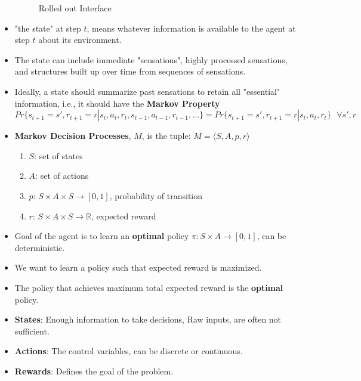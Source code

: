 \documentclass[a4paper]{article}
\begin{document}
\begin{itemize}
\begin{figure}[H]
        \caption{Rolled out Interface}
    \end{figure}
    \item "the state" at step $t$, means whatever information is available to the agent at step $t$ about its environment.
    \item The state can include immediate "sensations", highly processed sensations, and structures built up over time from sequences of sensations.
    \item Ideally, a state should summarize past sensations to retain all "essential" information, i.e., it should have the \textbf{Markov Property}
    \begin{equation*}
        Pr\{s_{t+1}=s',r_{t+1}=r|s_t,a_t,r_t,s_{t-1},a_{t-1},r_{t-1},...\}=Pr\{s_{t+1}=s',r_{t+1}=r|s_t,a_t,r_t\}\text{ }\forall s',r
    \end{equation*}
    \item \textbf{Markov Decision Processes}, $M$, is the tuple: $M=\langle S,A,p,r\rangle$
    \begin{enumerate}
        \item $S$: set of states
        \item $A$: set of actions
        \item $p$: $S\times A\times S\to [0,1]$, probability of transition
        \item $r$: $S\times A\times S\to \mathbb{R}$, expected reward
    \end{enumerate}
    \item Goal of the agent is to learn an \textbf{optimal} policy $\pi:S\times A\to [0,1]$, can be deterministic.
    \item We want to learn a policy such that expected reward is maximized.
    \item The policy that achieves maximum total expected reward is the \textbf{optimal} policy.
    \item \textbf{States}: Enough information to take decisions, Raw inputs, are often not sufficient.
    \item \textbf{Actions}: The control variables, can be discrete or continuous.
    \item \textbf{Rewards}: Defines the goal of the problem.
\end{itemize}
\end{document}
